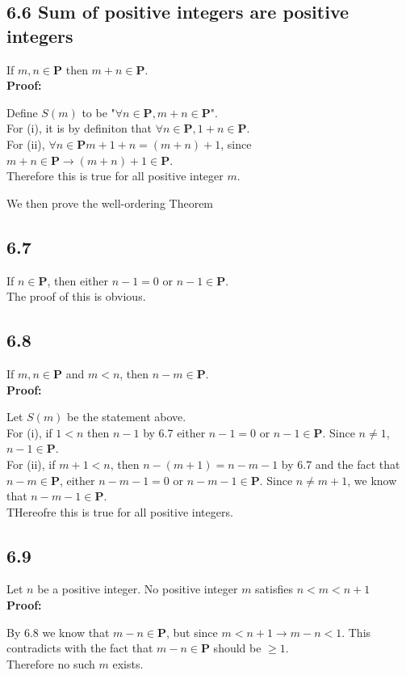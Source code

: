 \documentclass{article}
\begin{document}
\subsection*{6.6 Sum of positive integers are positive integers}
If $m, n \in \mathbf{P}$ then $m + n \in \mathbf{P}$.\\
\textbf{Proof:}
\begin{addmargin}[1em]{0em}
    Define $S(m)$ to be "$\forall n \in \mathbf{P}, m+n \in \mathbf{P}$".\\
    For (i), it is by definiton that $\forall n \in \mathbf{P}, 1+n \in \mathbf{P}$.\\
    For (ii), $\forall n \in \mathbf{P} m+1+n = (m+n) + 1$, since $m+n \in \mathbf{P} \rightarrow (m+n) + 1 \in \mathbf{P}$.\\
    Therefore this is true for all positive integer $m$.
\end{addmargin}
We then prove the well-ordering Theorem
\subsection*{6.7}
If $n \in \mathbf{P}$, then either $n - 1 = 0$ or $n - 1 \in \mathbf{P}$.\\
The proof of this is obvious.
\subsection*{6.8}
If $m, n \in \mathbf{P}$ and $m < n$, then $n - m \in \mathbf{P}$.\\
\textbf{Proof:}
\begin{addmargin}[1em]{0em}
    Let $S(m)$ be the statement above.\\
    For (i), if $1 < n$ then $n - 1$ by 6.7 either $n - 1 = 0$ or $n - 1 \in \mathbf{P}$. Since $n \neq 1$, $n - 1 \in \mathbf{P}$.\\
    For (ii), if $m+1 < n$, then $n - (m+1) = n - m - 1$ by 6.7 and the fact that $n - m \in \mathbf{P}$, either $n - m - 1 = 0$ or $n - m - 1 \in \mathbf{P}$. Since $n \neq m+1$, we know that $n - m - 1 \in \mathbf{P}$.\\
    THereofre this is true for all positive integers.
\end{addmargin}
\subsection*{6.9}
Let $n$ be a positive integer. No positive integer $m$ satisfies $n < m < n+1$\\
\textbf{Proof:}
\begin{addmargin}[1em]{0em}
    By 6.8 we know that $m - n \in \mathbf{P}$, but since $m < n + 1 \rightarrow m - n < 1$. This contradicts with the fact that $m - n \in \mathbf{P}$ should be $ \geq 1$.\\
    Therefore no such $m$ exists.
\end{addmargin}
\end{document}

